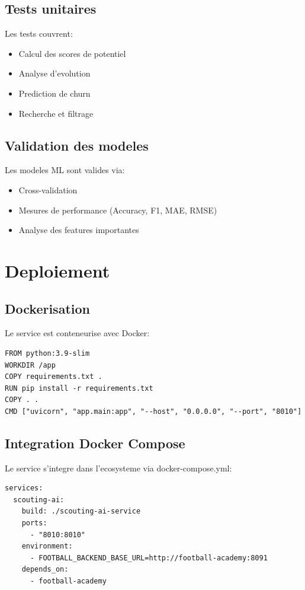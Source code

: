 \subsection*{Tests unitaires}

Les tests couvrent:
\begin{itemize}[leftmargin=*]
  \item Calcul des scores de potentiel
  \item Analyse d'evolution
  \item Prediction de churn
  \item Recherche et filtrage
\end{itemize}

\subsection*{Validation des modeles}

Les modeles ML sont valides via:
\begin{itemize}[leftmargin=*]
  \item Cross-validation
  \item Mesures de performance (Accuracy, F1, MAE, RMSE)
  \item Analyse des features importantes
\end{itemize}

\section{Deploiement}

\subsection*{Dockerisation}

Le service est conteneurise avec Docker:

\begin{lstlisting}[style=codeblock]
FROM python:3.9-slim
WORKDIR /app
COPY requirements.txt .
RUN pip install -r requirements.txt
COPY . .
CMD ["uvicorn", "app.main:app", "--host", "0.0.0.0", "--port", "8010"]
\end{lstlisting}

\subsection*{Integration Docker Compose}

Le service s'integre dans l'ecosysteme via docker-compose.yml:

\begin{lstlisting}[style=codeblock]
services:
  scouting-ai:
    build: ./scouting-ai-service
    ports:
      - "8010:8010"
    environment:
      - FOOTBALL_BACKEND_BASE_URL=http://football-academy:8091
    depends_on:
      - football-academy
\end{lstlisting}
